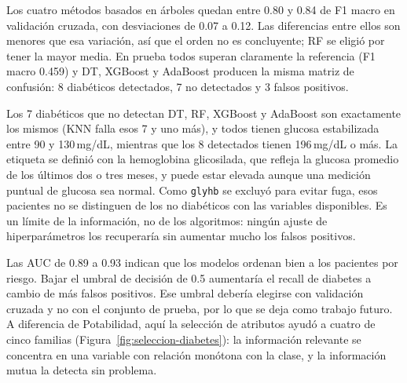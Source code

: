 Los cuatro métodos basados en árboles quedan entre 0.80 y 0.84 de F1 macro en
validación cruzada, con desviaciones de 0.07 a 0.12. Las diferencias entre ellos son
menores que esa variación, así que el orden no es concluyente; RF se eligió por tener
la mayor media. En prueba todos superan claramente la referencia (F1 macro 0.459) y DT,
XGBoost y AdaBoost producen la misma matriz de confusión: 8 diabéticos detectados, 7 no
detectados y 3 falsos positivos.

Los 7 diabéticos que no detectan DT, RF, XGBoost y AdaBoost son exactamente los mismos
(KNN falla esos 7 y uno más), y todos tienen glucosa estabilizada entre 90 y 130\,mg/dL, mientras que los 8 detectados
tienen 196\,mg/dL o más. La etiqueta se definió con la hemoglobina glicosilada, que
refleja la glucosa promedio de los últimos dos o tres meses, y puede estar elevada
aunque una medición puntual de glucosa sea normal. Como \texttt{glyhb} se excluyó para
evitar fuga, esos pacientes no se distinguen de los no diabéticos con las variables
disponibles. Es un límite de la información, no de los algoritmos: ningún ajuste de
hiperparámetros los recuperaría sin aumentar mucho los falsos positivos.

Las AUC de 0.89 a 0.93 indican que los modelos ordenan bien a los pacientes por riesgo.
Bajar el umbral de decisión de 0.5 aumentaría el recall de diabetes a cambio de más
falsos positivos. Ese umbral debería elegirse con validación cruzada y no con el
conjunto de prueba, por lo que se deja como trabajo futuro. A diferencia de
Potabilidad, aquí la selección de atributos ayudó a cuatro de cinco familias
(Figura~\ref{fig:seleccion-diabetes}): la información relevante se concentra en una
variable con relación monótona con la clase, y la información mutua la detecta sin
problema.
